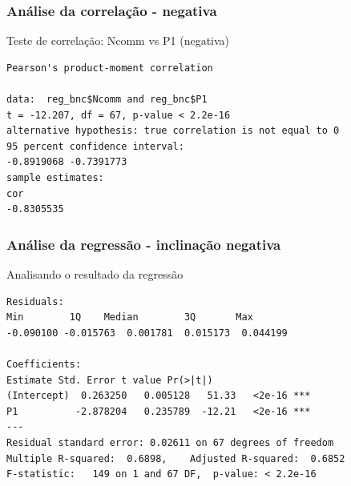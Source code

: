 \documentclass[graphics,14pt]{beamer}
\begin{document}
\begin{frame}[t,fragile=singleslide]
\frametitle{Análise da correlação - negativa}
\vspace{0.5cm}
Teste de correlação: Ncomm vs P1 (negativa)
\vspace{0.5cm}

\begin{lstlisting}
Pearson's product-moment correlation

data:  reg_bnc$Ncomm and reg_bnc$P1
t = -12.207, df = 67, p-value < 2.2e-16
alternative hypothesis: true correlation is not equal to 0
95 percent confidence interval:
-0.8919068 -0.7391773
sample estimates:
cor 
-0.8305535 
\end{lstlisting}
\end{frame}
\begin{frame}[t,fragile=singleslide]
\frametitle{Análise da regressão - inclinação negativa}
\vspace{1cm}
Analisando o resultado da regressão
\vspace{0.5cm}
\begin{lstlisting}
Residuals:
Min        1Q    Median        3Q       Max 
-0.090100 -0.015763  0.001781  0.015173  0.044199 

Coefficients:
Estimate Std. Error t value Pr(>|t|)    
(Intercept)  0.263250   0.005128   51.33   <2e-16 ***
P1          -2.878204   0.235789  -12.21   <2e-16 ***
---
Residual standard error: 0.02611 on 67 degrees of freedom
Multiple R-squared:  0.6898,	Adjusted R-squared:  0.6852 
F-statistic:   149 on 1 and 67 DF,  p-value: < 2.2e-16
\end{lstlisting}
\end{frame}
\end{document}
